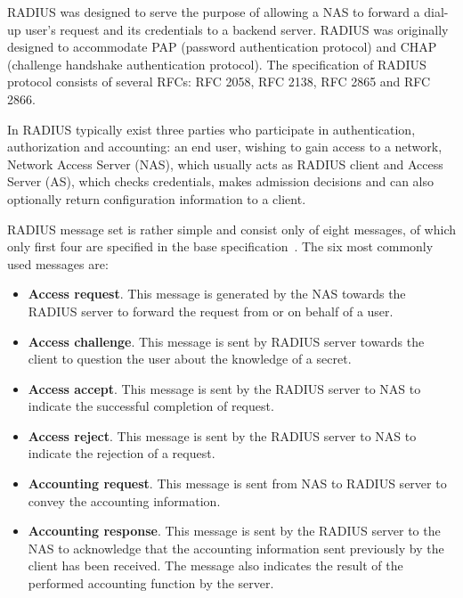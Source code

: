RADIUS was designed to serve the purpose of allowing a NAS to forward a 
dial-up user’s request and its credentials to a backend server. RADIUS 
was originally designed to accommodate PAP (password authentication protocol) and 
CHAP (challenge handshake authentication protocol). The specification of 
RADIUS protocol consists of several RFCs: RFC 2058, RFC 2138, RFC 2865 and RFC 2866. 

In RADIUS typically exist three parties who participate in 
authentication, authorization and accounting: an end user, wishing to gain access to a network,
Network Access Server (NAS), which usually acts as RADIUS client and Access Server (AS), which checks
credentials, makes admission decisions and can also optionally return configuration information
to a client.

RADIUS message set is rather simple and consist only of eight messages, of which only 
first four are specified in the base specification~\cite{AAA}. The six most commonly 
used messages are: 

\begin{itemize}
\item \textbf{Access request}. This message is generated by the NAS towards the RADIUS server
to forward the request from or on behalf of a user.	
\item \textbf{Access challenge}. This message is sent by RADIUS server towards the client to question 
the user about the knowledge of a secret.
\item \textbf{Access accept}. This message is sent by the RADIUS server to NAS to indicate the successful
completion of request. 
\item \textbf{Access reject}. This message is sent by the RADIUS server to NAS to indicate the 
rejection of a request.
\item \textbf{Accounting request}. This message is sent from NAS to RADIUS server to convey the 
accounting information.
\item \textbf{Accounting response}. This message is sent by the RADIUS server to the NAS to acknowledge 
that the accounting information sent previously by the client has been received. The message also 
indicates the result of the performed accounting function by the server.
\end{itemize}

